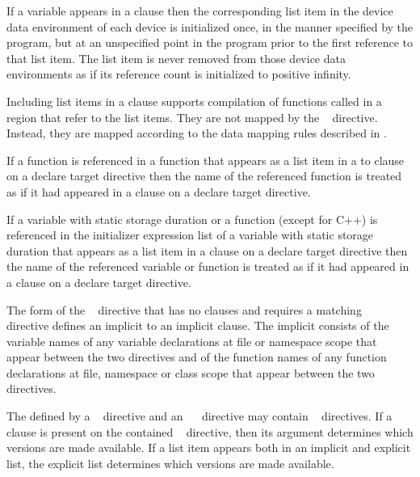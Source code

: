 If a variable appears in a  clause then the corresponding list
item in the device data environment of each device is initialized once, in the
manner specified by the program, but at an unspecified point in the program
prior to the first reference to that list item.  The list item is never removed
from those device data environments as if its reference count is initialized to
positive infinity.

Including list items in a  clause supports compilation of
functions called in a  region that refer to the list
items.  They are not mapped by the ~
directive.  Instead, they are mapped according to the data mapping
rules described in .

\begin{ccppspecific}
If a function is referenced in a function that appears as a list item in a to
clause on a declare target directive then the name of the referenced function
is treated as if it had appeared in a  clause on a declare target directive.

If a variable with static storage duration or a function (except 
for C++) is referenced in the initializer expression list of a variable with
static storage duration that appears as a list item in a  clause on a declare
target directive then the name of the referenced variable or function is treated
as if it had appeared in a  clause on a declare target directive.

The form of the ~ directive that has no clauses
and requires a matching ~~ directive
defines an implicit  to an implicit 
clause. The implicit  consists of the variable names
of any variable declarations at file or namespace scope that appear between
the two directives and of the function names of any function declarations at
file, namespace or class scope that appear between the two directives.

The  defined by a
~ directive and an
~~ directive may contain
~ directives. If a  clause
is present on the contained ~ directive, then its
argument determines which versions are made available.
If a list item appears both in an implicit and explicit list, the explicit
list determines which versions are made available.

\end{ccppspecific}

